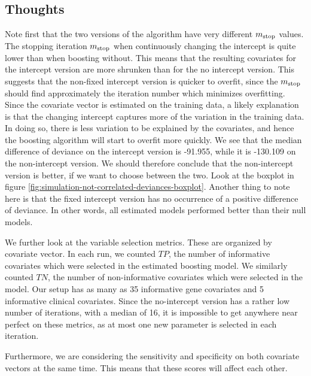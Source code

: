 \subsection{Thoughts}
Note first that the two versions of the algorithm have very different $m_{\text{stop}}$ values.
The stopping iteration $m_{\text{stop}}$ when continuously changing the intercept is quite lower than when boosting without.
This means that the resulting covariates for the intercept version are more shrunken than for the no intercept version.
This suggests that the non-fixed intercept version is quicker to overfit, since the $m_{\text{stop}}$ should find approximately the iteration number which minimizes overfitting.
Since the covariate vector is estimated on the training data, a likely explanation is that the changing intercept captures more of the variation in the training data.
In doing so, there is less variation to be explained by the covariates, and hence the boosting algorithm will start to overfit more quickly.
We see that the median difference of deviance on the intercept version is -91.955, while it is -130.109 on the non-intercept version.
We should therefore conclude that the non-intercept version is better, if we want to choose between the two.
Look at the boxplot in figure \ref{fig:simulation-not-correlated-deviances-boxplot}.
Another thing to note here is that the fixed intercept version has no occurrence of a positive difference of deviance.
In other words, all estimated models performed better than their null models.

We further look at the variable selection metrics.
These are organized by covariate vector.
In each run, we counted $TP$, the number of informative covariates which were selected in the estimated boosting model.
We similarly counted $TN$, the number of non-informative covariates which were selected in the model.
Our setup has as many as 35 informative gene covariates and 5 informative clinical covariates.
Since the no-intercept version has a rather low number of iterations, with a median of 16, it is impossible to get anywhere near perfect on these metrics, as at most one new parameter is selected in each iteration.

Furthermore, we are considering the sensitivity and specificity on both covariate vectors at the same time.
This means that these scores will affect each other.

